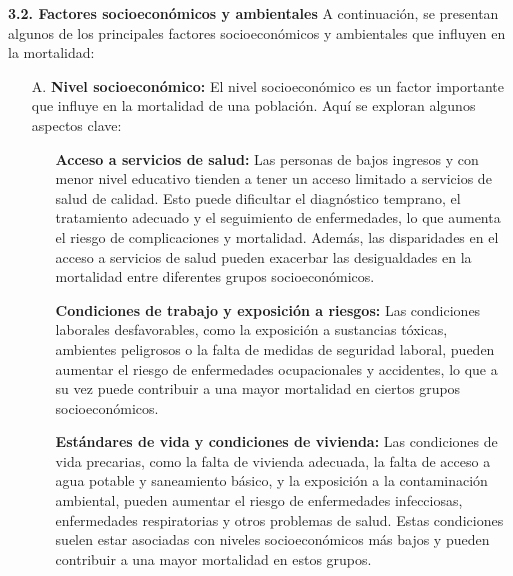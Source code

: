 \documentclass[8pt,a4paper]{beamer}
\begin{document}
{\begin{frame}{}
\setlength{\parskip}{3px}
\justifying
\begin{block}{\textbf{3.2. Factores socioeconómicos y ambientales}}
\setlength{\parskip}{3px}
\justifying
A continuación, se presentan algunos de los principales factores socioeconómicos y ambientales que influyen en la mortalidad:
\begin{enumerate}
\setlength{\parskip}{3px}
\justifying
\item[A.] \textbf{Nivel socioeconómico:}  
El nivel socioeconómico es un factor importante que influye en la mortalidad de una población. Aquí se exploran algunos aspectos clave:
\begin{enumerate}
\setlength{\parskip}{3px}
\justifying
\item[\ding{99}] \textbf{Acceso a servicios de salud:} Las personas de bajos ingresos y con menor nivel educativo tienden a tener un acceso limitado a servicios de salud de calidad. Esto puede dificultar el diagnóstico temprano, el tratamiento adecuado y el seguimiento de enfermedades, lo que aumenta el riesgo de complicaciones y mortalidad. Además, las disparidades en el acceso a servicios de salud pueden exacerbar las desigualdades en la mortalidad entre diferentes grupos socioeconómicos.

\item[\ding{99}] \textbf{Condiciones de trabajo y exposición a riesgos:} Las condiciones laborales desfavorables, como la exposición a sustancias tóxicas, ambientes peligrosos o la falta de medidas de seguridad laboral, pueden aumentar el riesgo de enfermedades ocupacionales y accidentes, lo que a su vez puede contribuir a una mayor mortalidad en ciertos grupos socioeconómicos.
\end{enumerate}
\end{enumerate}
\end{block}
\end{frame}


\begin{frame}{}
\setlength{\parskip}{3px}
\justifying
\begin{block}{}
\setlength{\parskip}{3px}
\justifying
\begin{enumerate}
\setlength{\parskip}{3px}
\justifying
\item[{}] 
\begin{enumerate}
\setlength{\parskip}{3px}
\justifying
\item[\ding{99}] \textbf{Estándares de vida y condiciones de vivienda:} Las condiciones de vida precarias, como la falta de vivienda adecuada, la falta de acceso a agua potable y saneamiento básico, y la exposición a la contaminación ambiental, pueden aumentar el riesgo de enfermedades infecciosas, enfermedades respiratorias y otros problemas de salud. Estas condiciones suelen estar asociadas con niveles socioeconómicos más bajos y pueden contribuir a una mayor mortalidad en estos grupos.


\end{enumerate}
\end{enumerate}
\end{block}
\end{frame}}
\end{document}
